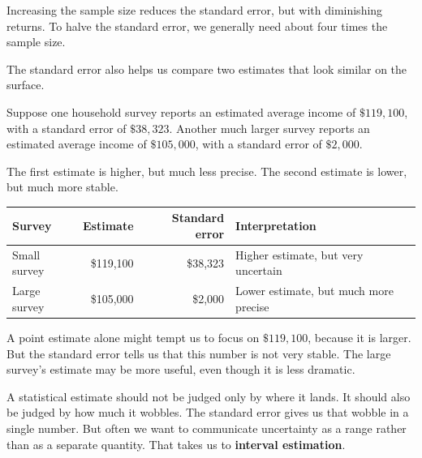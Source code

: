 \documentclass[
  letterpaper,
  DIV=11,
  numbers=noendperiod]{scrreprt}
\begin{document}
\begin{tcolorbox}[enhanced jigsaw, arc=.35mm, bottomrule=.15mm, bottomtitle=1mm, breakable, colback=white, colbacktitle=quarto-callout-important-color!10!white, colframe=quarto-callout-important-color-frame, coltitle=black, left=2mm, leftrule=.75mm, opacityback=0, opacitybacktitle=0.6, rightrule=.15mm, title=\textcolor{quarto-callout-important-color}{\faExclamation}\hspace{0.5em}{Precision has a cost}, titlerule=0mm, toprule=.15mm, toptitle=1mm]

Increasing the sample size reduces the standard error, but with
diminishing returns. To halve the standard error, we generally need
about four times the sample size.

\end{tcolorbox}

The standard error also helps us compare two estimates that look similar
on the surface.

Suppose one household survey reports an estimated average income of
\(\$119{,}100\), with a standard error of \(\$38{,}323\). Another much
larger survey reports an estimated average income of \(\$105{,}000\),
with a standard error of \(\$2{,}000\).

The first estimate is higher, but much less precise. The second estimate
is lower, but much more stable.

\begin{table}
\fontsize{12.0pt}{14.0pt}\selectfont
\begin{tabular*}{\linewidth}{@{\extracolsep{\fill}}lrrl}
\toprule
Survey & Estimate & Standard error & Interpretation \\ 
\midrule\addlinespace[2.5pt]
Small survey & \$119,100 & \$38,323 & Higher estimate, but very uncertain \\ 
Large survey & \$105,000 & \$2,000 & Lower estimate, but much more precise \\ 
\bottomrule
\end{tabular*}
\end{table}

A point estimate alone might tempt us to focus on \(\$119{,}100\),
because it is larger. But the standard error tells us that this number
is not very stable. The large survey's estimate may be more useful, even
though it is less dramatic.

A statistical estimate should not be judged only by where it lands. It
should also be judged by how much it wobbles. The standard error gives
us that wobble in a single number. But often we want to communicate
uncertainty as a range rather than as a separate quantity. That takes us
to \textbf{interval estimation}.
\end{document}
